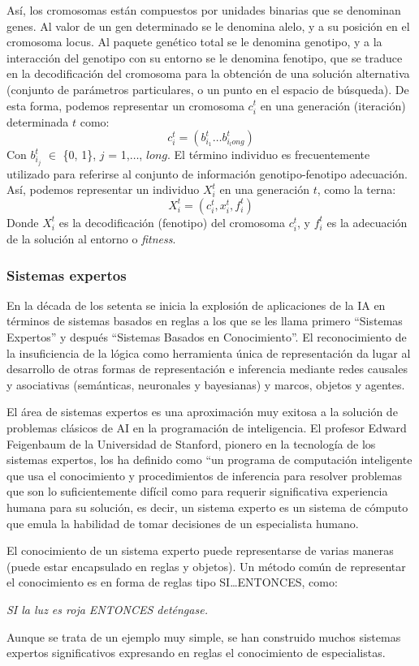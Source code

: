 Así, los cromosomas están compuestos por unidades binarias que se denominan genes. Al valor de un gen determinado se le denomina alelo, y a su posición en el cromosoma locus. Al paquete genético total se le denomina genotipo, y a la interacción del genotipo con su entorno se le denomina fenotipo, que se traduce en la decodificación del cromosoma para la obtención de una solución alternativa (conjunto de parámetros particulares, o un punto en el espacio de búsqueda). De esta forma, podemos representar un cromosoma $c_i^t$ en una generación (iteración) determinada $t$ como:
{\large $$ c_i^t = \displaystyle (b_{i_1}^t \ldots b_{i_long}^t)$$}
Con $b_{i_j}^t$ $\in$ \{0, 1\}, $j$ = 1,$\ldots$, $long$. El término individuo es frecuentemente utilizado para referirse al conjunto de información genotipo-fenotipo adecuación. Así, podemos representar un individuo $X_i^t$ en una generación $t$, como la terna:
{\large $$ X_i^t = \displaystyle (c_i^t, x_i^t, f_i^t)$$}
Donde $X_i^t$ es la decodificación (fenotipo) del cromosoma $c_i^t$, y $f_i^t$ es la adecuación de la solución al entorno o \textit{fitness}.

\subsubsection{Sistemas expertos}

En la década de los setenta se inicia la explosión de aplicaciones de la IA en términos de sistemas basados en reglas a los que se les llama primero “Sistemas Expertos” y después “Sistemas Basados en Conocimiento”. El reconocimiento de la insuficiencia de la lógica como herramienta única de representación da lugar al desarrollo de otras formas de representación e inferencia mediante redes causales y asociativas (semánticas, neuronales y bayesianas) y marcos, objetos y agentes.

El área de sistemas expertos es una aproximación muy exitosa a la solución de problemas clásicos de AI en la programación de inteligencia. El profesor Edward Feigenbaum de la Universidad de Stanford, pionero en la tecnología de los sistemas expertos, los ha definido como “un programa de computación inteligente que usa el conocimiento y procedimientos de inferencia para resolver problemas que son lo suficientemente difícil como para requerir significativa experiencia humana para su solución, es decir, un sistema experto es un sistema de cómputo que emula la habilidad de tomar decisiones de un especialista humano.

El conocimiento de un sistema experto puede representarse de varias maneras (puede estar encapsulado en reglas y objetos). Un método común de representar el conocimiento es en forma de reglas tipo SI…ENTONCES, como:
\begin{center}
	\textit{SI la luz es roja ENTONCES deténgase.}
\end{center}
Aunque se trata de un ejemplo muy simple, se han construido muchos sistemas expertos significativos expresando en reglas el conocimiento de especialistas.

